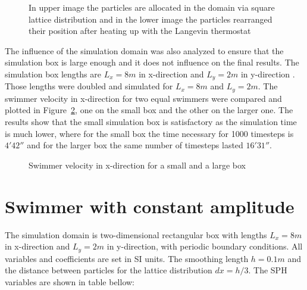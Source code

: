 \begin{figure}[H]
\centering
  \begin{footnotesize}
  
  \caption[In upper image the particles are allocated in the domain via square lattice distribution and in the lower image the particles rearranged their position after heating up with the  Langevin thermostat]{In upper image the particles are allocated in the domain via square lattice distribution and in the lower image the particles rearranged their position after heating up with the  Langevin thermostat}
  \label{fig:Bild4.2}
  \end{footnotesize}
\end{figure} 


The influence of the simulation domain was also analyzed to ensure that the simulation box is large enough and it does not influence on the final results. The simulation box 
lengths are $L_{x}= 8m$ in x-direction and $L_{y}=2m$ in y-direction . Those lengths were doubled and simulated for $L_{x}= 8m$ and $L_{y}=2m$. The swimmer velocity in x-direction
for two equal swimmers were compared and plotted in Figure~\ref{fig:Bild4.3}, one on the small box and the other on the larger one. The results show that the small simulation box is 
satisfactory as the simulation time is much lower, where for the small box the time necessary for 1000 timesteps is $4'42''$ and for the larger box the same number of timesteps
lasted $16'31''$.


\begin{figure}[H]
\centering
  \begin{footnotesize}
  
  \caption[Swimmer velocity in x-direction for a small and a large box]{Swimmer velocity in x-direction for a small and a large box }
  \label{fig:Bild4.3}
  \end{footnotesize}
\end{figure} 


\section{Swimmer with constant amplitude}
\label{sec:section 3}

The simulation domain is two-dimensional rectangular box with lengths $L_{x}= 8m$ in x-direction and $L_{y}=2m$ in y-direction, with periodic boundary conditions. All variables
and coefficients are set in SI units. The smoothing length $h=0.1m$ and the distance between particles for the lattice distribution $dx=h/3$. The SPH variables are shown in
table bellow:
\par


